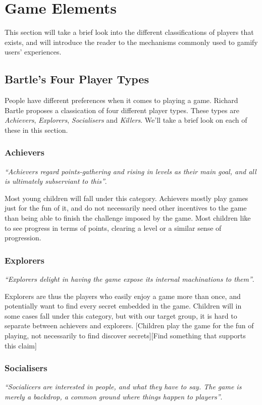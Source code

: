 \section{Game Elements}
\label{sec:gameelements}

This section will take a brief look into the different classifications of players that exists, and will introduce the reader to the mechanisms commonly used to gamify users' experiences. 

\subsection{Bartle's Four Player Types}
\label{sec:bartlesplayertypes}
People have different preferences when it comes to playing a game. Richard Bartle proposes a classication of four different player types\cite{bartle-gamers}. These types are \emph{Achievers},  \emph{Explorers},  \emph{Socialisers} and \emph{Killers}. We'll take a brief look on each of these in this section. 

\subsubsection{Achievers}
\textit{``Achievers regard points-gathering and rising in levels as their main goal, and all is ultimately subserviant to this''}\cite{bartle-gamers}. 

Most young children will fall under this category. Achievers mostly play games just for the fun of it, and do not necessarily need other incentives to the game than being able to finish the challenge imposed by the game. Most children like to see progress in terms of points, clearing a level or a similar sense of progression. 

\subsubsection{Explorers}
\textit{``Explorers delight in having the game expose its internal machinations to them''}\cite{bartle-gamers}.

Explorers are thus the players who easily enjoy a game more than once, and potentially want to find every secret embedded in the game. Children will in some cases fall under this category, but with our target group, it is hard to separate between achievers and explorers. 
[Children play the game for the fun of playing, not necessarily to find discover secrets][Find something that supports this claim] 

\subsubsection{Socialisers}
\textit{``Socialicers are interested in people, and what they have to say. The game is merely a backdrop, a common ground where things happen to players''}\cite{bartle-gamers}. 

